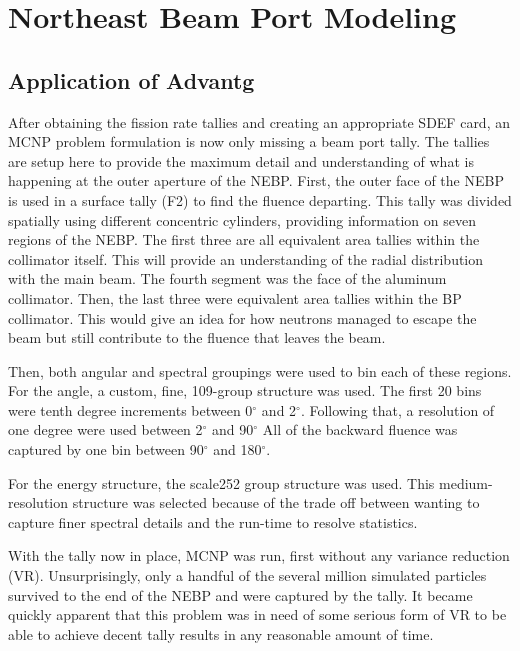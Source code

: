 
\cleardoublepage


\chapter{Northeast Beam Port Modeling}


\section{Application of Advantg}

After obtaining the fission rate tallies and creating an appropriate SDEF card, an MCNP problem formulation is now only missing a beam port tally.
The tallies are setup here to provide the maximum detail and understanding of what is happening at the outer aperture of the NEBP.
First, the outer face of the NEBP is used in a surface tally (F2) to find the fluence departing.
This tally was divided spatially using different concentric cylinders, providing information on seven regions of the NEBP.
The first three are all equivalent area tallies within the collimator itself.
This will provide an understanding of the radial distribution with the main beam.
The fourth segment was the face of the aluminum collimator.
Then, the last three were equivalent area tallies within the BP collimator.
This would give an idea for how neutrons managed to escape the beam but still contribute to the fluence that leaves the beam.

Then, both angular and spectral groupings were used to bin each of these regions.
For the angle, a custom, fine, 109-group structure was used.
The first 20 bins were tenth degree increments between 0$^{\circ}$ and 2$^{\circ}$.
Following that, a resolution of one degree were used between 2$^{\circ}$ and 90$^{\circ}$
All of the backward fluence was captured by one bin between 90$^{\circ}$ and 180$^{\circ}$.

For the energy structure, the scale252 group structure was used.
This medium-resolution structure was selected because of the trade off between wanting to capture finer spectral details and the run-time to resolve statistics.

With the tally now in place, MCNP was run, first without any variance reduction (VR).
Unsurprisingly, only a handful of the several million simulated particles survived to the end of the NEBP and were captured by the tally.
It became quickly apparent that this problem was in need of some serious form of VR to be able to achieve decent tally results in any reasonable amount of time.


